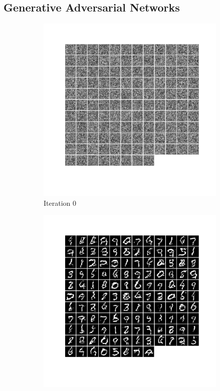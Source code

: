 \documentclass[12pt]{article}
\begin{document}
\newpage
\subsection{Generative Adversarial Networks}
\begin{figure}[htbp]
    \centering
    \begin{subfigure}[t]{0.48\textwidth}
        \centering
        \includegraphics[trim={3in 2in 3in 0in},scale=0.3]{./Homework3/output/gan/0.png}
        \caption{Iteration 0}
    \label{hw3p4a}
    \end{subfigure}
    \begin{subfigure}[t]{0.48\textwidth}
        \centering
        \includegraphics[trim={3in 2in 3in 0in},scale=0.3]{./Homework3/output/gan/1.png}

\end{subfigure}
\end{figure}
\end{document}
